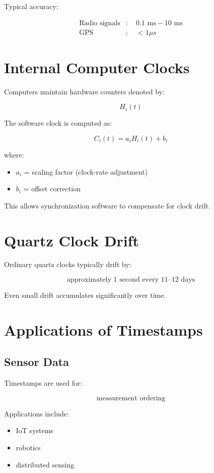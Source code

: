 Typical accuracy:

\[
\begin{aligned}
\text{Radio signals} &:\quad 0.1\text{ ms} - 10\text{ ms} \\
\text{GPS} &:\quad < 1\mu s
\end{aligned}
\]

\section{Internal Computer Clocks}

Computers maintain hardware counters denoted by:

\[
H_i(t)
\]

The software clock is computed as:

\[
C_i(t)=a_iH_i(t)+b_i
\]

where:

\begin{itemize}
    \item \(a_i\) = scaling factor (clock-rate adjustment)
    \item \(b_i\) = offset correction
\end{itemize}

This allows synchronization software to compensate for clock drift.

\section{Quartz Clock Drift}

Ordinary quartz clocks typically drift by:

\[
\text{approximately 1 second every 11--12 days}
\]

Even small drift accumulates significantly over time.

\section{Applications of Timestamps}

\subsection{Sensor Data}

Timestamps are used for:

\[
\text{measurement ordering}
\]

Applications include:

\begin{itemize}
    \item IoT systems
    \item robotics
    \item distributed sensing
\end{itemize}

